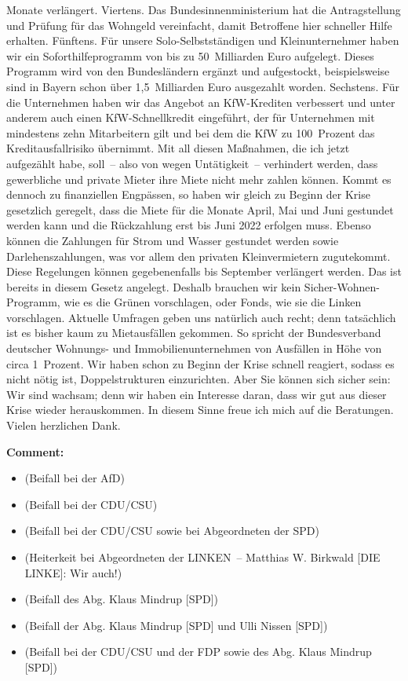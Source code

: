 \documentclass{article}
\begin{document}
Monate verlängert. Viertens. Das Bundesinnenministerium hat die Antragstellung und Prüfung für das Wohngeld vereinfacht, damit Betroffene hier schneller Hilfe erhalten. Fünftens. Für unsere Solo-Selbstständigen und Kleinunternehmer haben wir ein Soforthilfeprogramm von bis zu 50 Milliarden Euro aufgelegt. Dieses Programm wird von den Bundesländern ergänzt und aufgestockt, beispielsweise sind in Bayern schon über 1,5 Milliarden Euro ausgezahlt worden. Sechstens. Für die Unternehmen haben wir das Angebot an KfW-Krediten verbessert und unter anderem auch einen KfW-Schnellkredit eingeführt, der für Unternehmen mit mindestens zehn Mitarbeitern gilt und bei dem die KfW zu 100 Prozent das Kreditausfallrisiko übernimmt. Mit all diesen Maßnahmen, die ich jetzt aufgezählt habe, soll – also von wegen Untätigkeit – verhindert werden, dass gewerbliche und private Mieter ihre Miete nicht mehr zahlen können. Kommt es dennoch zu finanziellen Engpässen, so haben wir gleich zu Beginn der Krise gesetzlich geregelt, dass die Miete für die Monate April, Mai und Juni gestundet werden kann und die Rückzahlung erst bis Juni 2022 erfolgen muss. Ebenso können die Zahlungen für Strom und Wasser gestundet werden sowie Darlehenszahlungen, was vor allem den privaten Kleinvermietern zugutekommt. Diese Regelungen können gegebenenfalls bis September verlängert werden. Das ist bereits in diesem Gesetz angelegt.  Deshalb brauchen wir kein Sicher-Wohnen-Programm, wie es die Grünen vorschlagen, oder Fonds, wie sie die Linken vorschlagen. Aktuelle Umfragen geben uns natürlich auch recht; denn tatsächlich ist es bisher kaum zu Mietausfällen gekommen. So spricht der Bundesverband deutscher Wohnungs- und Immobilienunternehmen von Ausfällen in Höhe von circa 1 Prozent. Wir haben schon zu Beginn der Krise schnell reagiert, sodass es nicht nötig ist, Doppelstrukturen einzurichten. Aber Sie können sich sicher sein: Wir sind wachsam; denn wir haben ein Interesse daran, dass wir gut aus dieser Krise wieder herauskommen. In diesem Sinne freue ich mich auf die Beratungen. Vielen herzlichen Dank.  

\noindent\textbf{Comment:}
\begin{itemize}
    \setlength\itemsep{-3pt}
    \item (Beifall bei der AfD)
    \setlength\itemsep{-3pt}
    \item (Beifall bei der CDU/CSU)
    \setlength\itemsep{-3pt}
    \item (Beifall bei der CDU/CSU sowie bei Abgeordneten der SPD)
    \setlength\itemsep{-3pt}
    \item (Heiterkeit bei Abgeordneten der LINKEN – Matthias W. Birkwald [DIE LINKE]: Wir auch!)
    \setlength\itemsep{-3pt}
    \item (Beifall des Abg. Klaus Mindrup [SPD])
    \setlength\itemsep{-3pt}
    \item (Beifall der Abg. Klaus Mindrup [SPD] und Ulli Nissen [SPD])
    \setlength\itemsep{-3pt}
    \item (Beifall bei der CDU/CSU und der FDP sowie des Abg. Klaus Mindrup [SPD])
\end{itemize}
\end{document}
